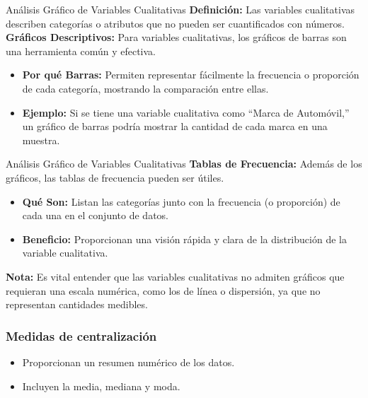 \documentclass[aspectratio=169]{beamer}
\begin{document}
\begin{frame}{Análisis Gráfico de Variables Cualitativas}
  \textbf{Definición:} Las variables cualitativas describen categorías o atributos que no pueden ser cuantificados con números.\\
  \textbf{Gráficos Descriptivos:} Para variables cualitativas, los gráficos de barras son una herramienta común y efectiva.
  \begin{itemize}
    \item \textbf{Por qué Barras:} Permiten representar fácilmente la frecuencia o proporción de cada categoría, mostrando la comparación entre ellas.
    \item \textbf{Ejemplo:} Si se tiene una variable cualitativa como ``Marca de Automóvil,'' un gráfico de barras podría mostrar la cantidad de cada marca en una muestra.
  \end{itemize}
\end{frame}



\begin{frame}{Análisis Gráfico de Variables Cualitativas}
  \textbf{Tablas de Frecuencia:} Además de los gráficos, las tablas de frecuencia pueden ser útiles.
  \begin{itemize}
    \item \textbf{Qué Son:} Listan las categorías junto con la frecuencia (o proporción) de cada una en el conjunto de datos.
    \item \textbf{Beneficio:} Proporcionan una visión rápida y clara de la distribución de la variable cualitativa.
  \end{itemize}
  \textbf{Nota:} Es vital entender que las variables cualitativas no admiten gráficos que requieran una escala numérica, como los de línea o dispersión, ya que no representan cantidades medibles.
\end{frame}


\begin{frame}
\frametitle{Medidas de centralización}

\begin{itemize}
    \item Proporcionan un resumen numérico de los datos.
    \item Incluyen la media, mediana y moda.
\end{itemize}

\end{frame}
\end{document}
